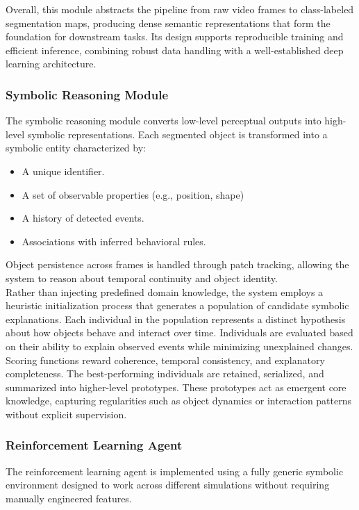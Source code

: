 \documentclass[12pt,a4paper]{report}
\begin{document}
Overall, this module abstracts the pipeline from raw video frames to class-labeled segmentation maps, producing dense semantic representations that form the foundation for downstream tasks. Its design supports reproducible training and efficient inference, combining robust data handling with a well-established deep learning architecture.

\subsubsection{Symbolic Reasoning Module}
The symbolic reasoning module converts low-level perceptual outputs into high-level symbolic representations. Each segmented object is transformed into a symbolic entity characterized by:
\begin{itemize}
    \item A unique identifier.
    \item A set of observable properties (e.g., position, shape)
    \item A history of detected events.
    \item Associations with inferred behavioral rules.
\end{itemize}
Object persistence across frames is handled through patch tracking, allowing the system to reason about temporal continuity and object identity.
\\
Rather than injecting predefined domain knowledge, the system employs a heuristic initialization process that generates a population of candidate symbolic explanations. Each individual in the population represents a distinct hypothesis about how objects behave and interact over time.
Individuals are evaluated based on their ability to explain observed events while minimizing unexplained changes. Scoring functions reward coherence, temporal consistency, and explanatory completeness.
The best-performing individuals are retained, serialized, and summarized into higher-level prototypes. These prototypes act as emergent core knowledge, capturing regularities such as object dynamics or interaction patterns without explicit supervision.

\subsubsection{Reinforcement Learning Agent}
The reinforcement learning agent is implemented using a fully generic symbolic environment designed to work across different simulations without requiring manually engineered features. 
\end{document}
